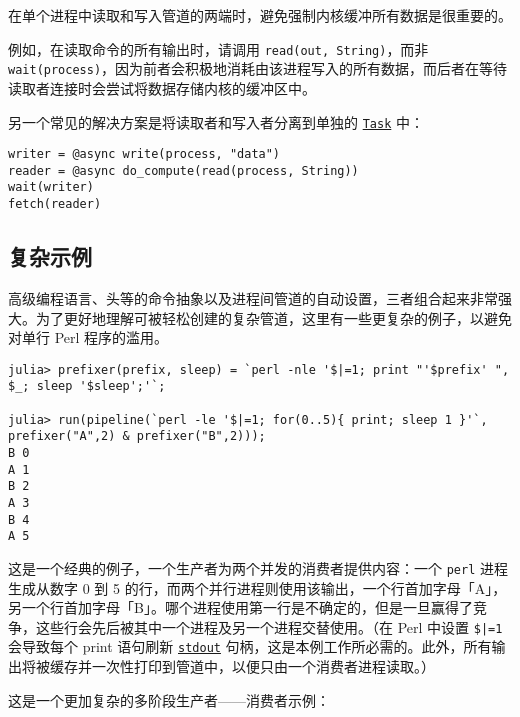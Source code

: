 在单个进程中读取和写入管道的两端时，避免强制内核缓冲所有数据是很重要的。



例如，在读取命令的所有输出时，请调用 \texttt{read(out, String)}，而非 \texttt{wait(process)}，因为前者会积极地消耗由该进程写入的所有数据，而后者在等待读取者连接时会尝试将数据存储内核的缓冲区中。



另一个常见的解决方案是将读取者和写入者分离到单独的 \hyperlink{7131243650304654155}{\texttt{Task}} 中：




\begin{verbatim}
writer = @async write(process, "data")
reader = @async do_compute(read(process, String))
wait(writer)
fetch(reader)
\end{verbatim}



\hypertarget{14183945833806948978}{}


\subsection{复杂示例}



高级编程语言、头等的命令抽象以及进程间管道的自动设置，三者组合起来非常强大。为了更好地理解可被轻松创建的复杂管道，这里有一些更复杂的例子，以避免对单行 Perl 程序的滥用。




\begin{verbatim}
julia> prefixer(prefix, sleep) = `perl -nle '$|=1; print "'$prefix' ", $_; sleep '$sleep';'`;

julia> run(pipeline(`perl -le '$|=1; for(0..5){ print; sleep 1 }'`, prefixer("A",2) & prefixer("B",2)));
B 0
A 1
B 2
A 3
B 4
A 5
\end{verbatim}



这是一个经典的例子，一个生产者为两个并发的消费者提供内容：一个 \texttt{perl} 进程生成从数字 0 到 5 的行，而两个并行进程则使用该输出，一个行首加字母「A」，另一个行首加字母「B」。哪个进程使用第一行是不确定的，但是一旦赢得了竞争，这些行会先后被其中一个进程及另一个进程交替使用。（在 Perl 中设置 \texttt{\$|=1} 会导致每个 print 语句刷新 \hyperlink{18181294266083891471}{\texttt{stdout}} 句柄，这是本例工作所必需的。此外，所有输出将被缓存并一次性打印到管道中，以便只由一个消费者进程读取。）



这是一个更加复杂的多阶段生产者——消费者示例：




